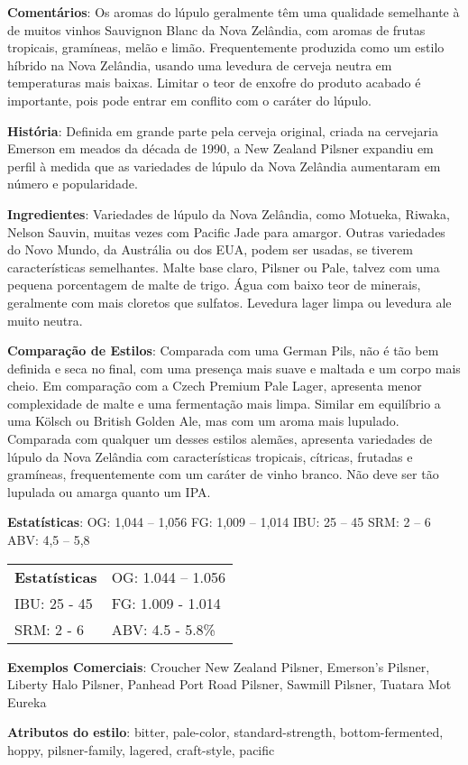 \textbf{Comentários}: Os aromas do lúpulo geralmente têm uma qualidade semelhante à de muitos vinhos Sauvignon Blanc da Nova Zelândia, com aromas de frutas tropicais, gramíneas, melão e limão. Frequentemente produzida como um estilo híbrido na Nova Zelândia, usando uma levedura de cerveja neutra em temperaturas mais baixas. Limitar o teor de enxofre do produto acabado é importante, pois pode entrar em conflito com o caráter do lúpulo.

\textbf{História}: Definida em grande parte pela cerveja original, criada na cervejaria Emerson em meados da década de 1990, a New Zealand Pilsner expandiu em perfil à medida que as variedades de lúpulo da Nova Zelândia aumentaram em número e popularidade.

\textbf{Ingredientes}: Variedades de lúpulo da Nova Zelândia, como Motueka, Riwaka, Nelson Sauvin, muitas vezes com Pacific Jade para amargor. Outras variedades do Novo Mundo, da Austrália ou dos EUA, podem ser usadas, se tiverem características semelhantes. Malte base claro, Pilsner ou Pale, talvez com uma pequena porcentagem de malte de trigo. Água com baixo teor de minerais, geralmente com mais cloretos que sulfatos. Levedura lager limpa ou levedura ale muito neutra.

\textbf{Comparação de Estilos}: Comparada com uma German Pils, não é tão bem definida e seca no final, com uma presença mais suave e maltada e um corpo mais cheio. Em comparação com a Czech Premium Pale Lager, apresenta menor complexidade de malte e uma fermentação mais limpa. Similar em equilíbrio a uma Kölsch ou British Golden Ale, mas com um aroma mais lupulado. Comparada com qualquer um desses estilos alemães, apresenta variedades de lúpulo da Nova Zelândia com características tropicais, cítricas, frutadas e gramíneas, frequentemente com um caráter de vinho branco. Não deve ser tão lupulada ou amarga quanto um IPA.

\textbf{Estatísticas}: OG: 1,044 – 1,056
FG: 1,009 – 1,014
IBU: 25 – 45
SRM: 2 – 6
ABV: 4,5 – 5,8%

\begin{tabular}{@{}p{35mm}p{35mm}@{}}
  \textbf{Estatísticas} & OG: 1.044 – 1.056\\
  IBU: 25 - 45 & FG: 1.009 - 1.014 \\
  SRM: 2 - 6  & ABV: 4.5 - 5.8\%
\end{tabular}

\textbf{Exemplos Comerciais}: Croucher New Zealand Pilsner, Emerson’s Pilsner, Liberty Halo Pilsner, Panhead Port Road Pilsner, Sawmill Pilsner, Tuatara Mot Eureka

\textbf{Atributos do estilo}: bitter, pale-color, standard-strength, bottom-fermented, hoppy, pilsner-family, lagered, craft-style, pacific

